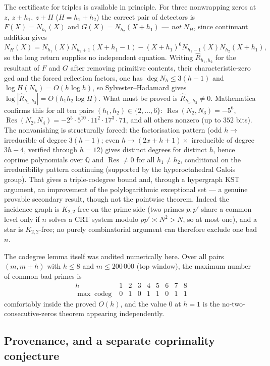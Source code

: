 The certificate for triples is available in principle.  For three nonwrapping zeros at
$z,\ z+h_1,\ z+H$ ($H=h_1+h_2$) the correct pair of detectors is
$F(X)=N_{h_1}(X)$ and $G(X)=N_{h_2}(X+h_1)$ — \emph{not} $N_H$, since continuant addition gives
\[
  N_H(X)=N_{h_1}(X)N_{h_2+1}(X+h_1-1)-(X+h_1)^6N_{h_1-1}(X)N_{h_2}(X+h_1),
\]
so the long return supplies no independent equation.  Writing $\widehat R_{h_1,h_2}$ for the
resultant of $F$ and $G$ after removing primitive contents, their characteristic-zero gcd and the
forced reflection factors, one has $\deg N_h\le3(h-1)$ and $\log H(N_h)=O(h\log h)$, so
Sylvester--Hadamard gives $\log|\widehat R_{h_1,h_2}|=O(h_1h_2\log H)$.  What must be proved is
$\widehat R_{h_1,h_2}\ne0$.  Mathematica confirms this for all ten pairs
$(h_1,h_2)\in\{2,\dots,6\}$: $\operatorname{Res}(N_2,N_3)=-5^6$,
$\operatorname{Res}(N_2,N_4)=-2^5\cdot5^{10}\cdot11^2\cdot17^3\cdot71$, and all others nonzero
(up to $352$ bits).  The nonvanishing is structurally forced: the factorisation pattern (odd
$h\to$ irreducible of degree $3(h-1)$; even $h\to(2x+h+1)\times$ irreducible of degree $3h-4$,
verified through $h=12$) gives distinct degrees for distinct $h$, hence coprime polynomials over
$\mathbb Q$ and $\operatorname{Res}\ne0$ for all $h_1\ne h_2$, conditional on the irreducibility
pattern continuing (supported by the hyperoctahedral Galois group).  That gives a triple-codegree
bound and, through a hypergraph KST argument, an improvement of the polylogarithmic exceptional
set — a genuine provable secondary result, though not the pointwise theorem.  Indeed the incidence graph is $K_{2,2}$-free on the prime side (two primes
$p,p'$ share a common level only if $n$ solves a CRT system modulo $pp'\asymp N^2>N$, so at most
one), and a star is $K_{2,2}$-free; no purely combinatorial argument can therefore exclude one
bad $n$.

The codegree lemma itself was audited numerically here.  Over all pairs $(m,m+h)$ with
$h\le8$ and $m\le200\,000$ (top window), the maximum number of common bad primes is
\[
\begin{array}{c|cccccccc}
 h&1&2&3&4&5&6&7&8\\ \hline
 \max\operatorname{codeg}&0&1&0&1&1&0&1&1
\end{array}
\]
comfortably inside the proved $O(h)$, and the value $0$ at $h=1$ is the no-two-consecutive-zeros
theorem appearing independently.

\subsection{Provenance, and a separate coprimality conjecture}

